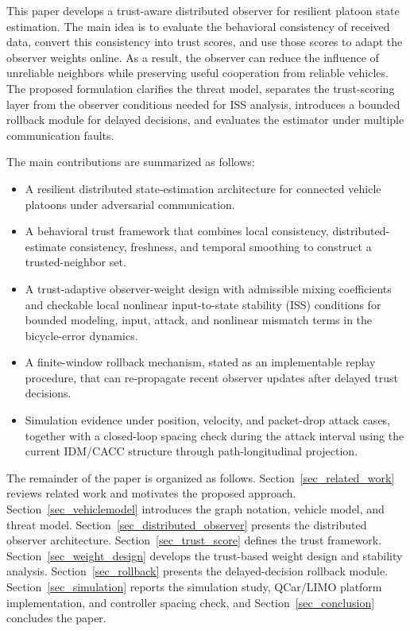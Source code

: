 \documentclass[journal,twoside]{IEEEtran}
\begin{document}
This paper develops a trust-aware distributed observer for resilient platoon state estimation. The main idea is to evaluate the behavioral consistency of received data, convert this consistency into trust scores, and use those scores to adapt the observer weights online. As a result, the observer can reduce the influence of unreliable neighbors while preserving useful cooperation from reliable vehicles. The proposed formulation clarifies the threat model, separates the trust-scoring layer from the observer conditions needed for ISS analysis, introduces a bounded rollback module for delayed decisions, and evaluates the estimator under multiple communication faults.

The main contributions are summarized as follows:
\begin{itemize}
    \item A resilient distributed state-estimation architecture for connected vehicle platoons under adversarial communication.
    \item A behavioral trust framework that combines local consistency, distributed-estimate consistency, freshness, and temporal smoothing to construct a trusted-neighbor set.
    \item A trust-adaptive observer-weight design with admissible mixing coefficients and checkable local nonlinear input-to-state stability (ISS) conditions for bounded modeling, input, attack, and nonlinear mismatch terms in the bicycle-error dynamics.
    \item A finite-window rollback mechanism, stated as an implementable replay procedure, that can re-propagate recent observer updates after delayed trust decisions.
    \item Simulation evidence under position, velocity, and packet-drop attack cases, together with a closed-loop spacing check during the attack interval using the current IDM/CACC structure through path-longitudinal projection.
\end{itemize}

The remainder of the paper is organized as follows. Section~\ref{sec_related_work} reviews related work and motivates the proposed approach. Section~\ref{sec_vehiclemodel} introduces the graph notation, vehicle model, and threat model. Section~\ref{sec_distributed_observer} presents the distributed observer architecture. Section~\ref{sec_trust_score} defines the trust framework. Section~\ref{sec_weight_design} develops the trust-based weight design and stability analysis. Section~\ref{sec_rollback} presents the delayed-decision rollback module. Section~\ref{sec_simulation} reports the simulation study, QCar/LIMO platform implementation, and controller spacing check, and Section~\ref{sec_conclusion} concludes the paper.
\end{document}
